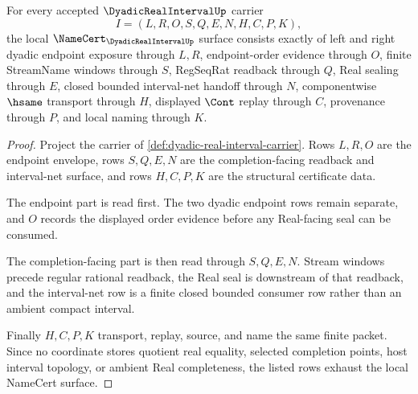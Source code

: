 \begin{theorem}
\label{thm:dyadic-real-interval-real-seal-obligations}
For every accepted $\DyadicRealIntervalUp$ carrier
$$
I=(L,R,O,S,Q,E,N,H,C,P,K),
$$
the local $\NameCert_{\DyadicRealIntervalUp}$ surface consists exactly of left and right dyadic endpoint exposure through $L,R$, endpoint-order evidence through $O$, finite StreamName windows through $S$, RegSeqRat readback through $Q$, Real sealing through $E$, closed bounded interval-net handoff through $N$, componentwise $\hsame$ transport through $H$, displayed $\Cont$ replay through $C$, provenance through $P$, and local naming through $K$.
\end{theorem}
\begin{proof}
Project the carrier of \autoref{def:dyadic-real-interval-carrier}. Rows $L,R,O$ are the endpoint envelope, rows $S,Q,E,N$ are the completion-facing readback and interval-net surface, and rows $H,C,P,K$ are the structural certificate data.

The endpoint part is read first. The two dyadic endpoint rows remain separate, and $O$ records the displayed order evidence before any Real-facing seal can be consumed.

The completion-facing part is then read through $S,Q,E,N$. Stream windows precede regular rational readback, the Real seal is downstream of that readback, and the interval-net row is a finite closed bounded consumer row rather than an ambient compact interval.

Finally $H,C,P,K$ transport, replay, source, and name the same finite packet. Since no coordinate stores quotient real equality, selected completion points, host interval topology, or ambient Real completeness, the listed rows exhaust the local NameCert surface.
\end{proof}

